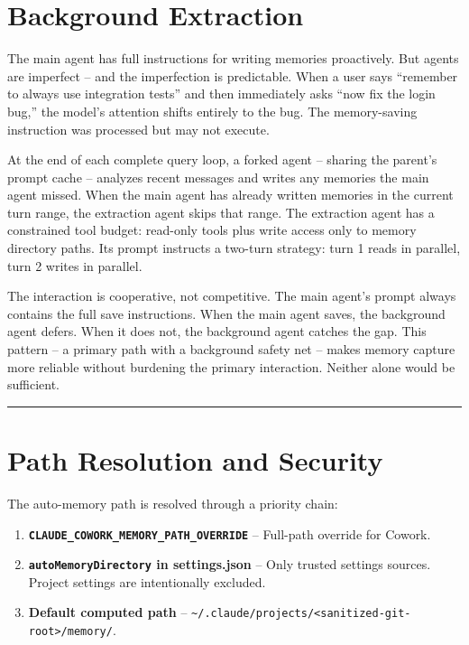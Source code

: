 \documentclass[
  english,
  11pt,
  letterpaper,
]{book}
\providecommand{\tightlist}{%
  \setlength{\itemsep}{0pt}\setlength{\parskip}{0pt}}
\begin{document}
\section{Background Extraction}\label{background-extraction}

The main agent has full instructions for writing memories proactively.
But agents are imperfect -- and the imperfection is predictable. When a
user says ``remember to always use integration tests'' and then
immediately asks ``now fix the login bug,'' the model's attention shifts
entirely to the bug. The memory-saving instruction was processed but may
not execute.

At the end of each complete query loop, a forked agent -- sharing the
parent's prompt cache -- analyzes recent messages and writes any
memories the main agent missed. When the main agent has already written
memories in the current turn range, the extraction agent skips that
range. The extraction agent has a constrained tool budget: read-only
tools plus write access only to memory directory paths. Its prompt
instructs a two-turn strategy: turn 1 reads in parallel, turn 2 writes
in parallel.

The interaction is cooperative, not competitive. The main agent's prompt
always contains the full save instructions. When the main agent saves,
the background agent defers. When it does not, the background agent
catches the gap. This pattern -- a primary path with a background safety
net -- makes memory capture more reliable without burdening the primary
interaction. Neither alone would be sufficient.

\begin{center}\rule{0.5\linewidth}{0.5pt}\end{center}

\section{Path Resolution and
Security}\label{path-resolution-and-security}

The auto-memory path is resolved through a priority chain:

\begin{enumerate}
\def\labelenumi{\arabic{enumi}.}
\tightlist
\item
  \textbf{\texttt{CLAUDE\_COWORK\_MEMORY\_PATH\_OVERRIDE}} -- Full-path
  override for Cowork.
\item
  \textbf{\texttt{autoMemoryDirectory} in settings.json} -- Only trusted
  settings sources. Project settings are intentionally excluded.
\item
  \textbf{Default computed path} --
  \texttt{\textasciitilde{}/.claude/projects/\textless{}sanitized-git-root\textgreater{}/memory/}.
\end{enumerate}
\end{document}

